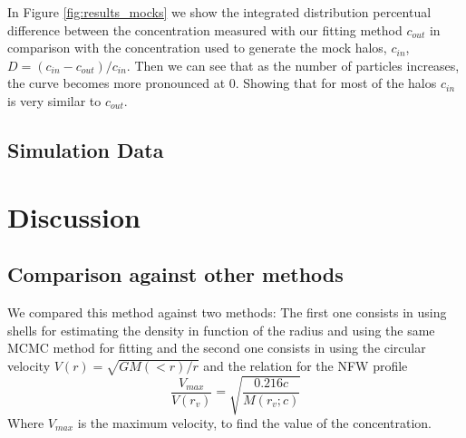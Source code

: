 \documentclass[useAMS,usenatbib]{mn2e}
\begin{document}
In Figure \ref{fig:results_mocks} we show the integrated distribution
percentual difference between the concentration measured with our
fitting method $c_{out}$ in comparison with the concentration used to
generate the mock halos, $c_{in}$, $D=(c_{in}-c_{out})/c_{in}$. Then we can see that as the number of particles increases, the curve becomes more pronounced at 0. Showing that for most of the halos $c_{in}$ is very similar to $c_{out}$.


\subsection{Simulation Data}
\label{sec:results_mocks}

\section{Discussion}
\label{sec:discussion}

\subsection{Comparison against other methods}
We compared this method against two methods: The first one consists in using shells for estimating the density in function of the radius and using the same MCMC method for fitting and the second one consists in using the circular velocity $V(r)=\sqrt{GM(<r)/r}$ and the relation for the NFW profile
\begin{equation}
\frac{V_{max}}{V(r_{v})} = \sqrt{\frac{0.216c}{M(r_{v};c)}}
\end{equation}
Where $V_{max}$ is the maximum velocity, to find the value of the concentration.
\end{document}
